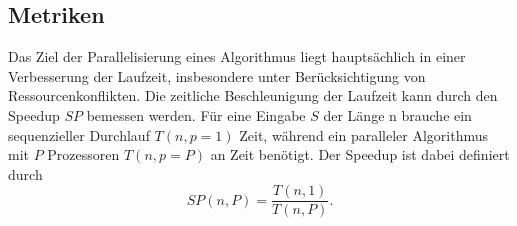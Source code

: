 \subsection{Metriken}
Das Ziel der Parallelisierung eines Algorithmus liegt hauptsächlich in einer Verbesserung der Laufzeit, insbesondere unter Berücksichtigung von Ressourcenkonflikten. Die zeitliche
Beschleunigung der Laufzeit kann durch den Speedup $SP$ bemessen werden. Für eine Eingabe $S$ der Länge n brauche ein sequenzieller Durchlauf $T(n, p=1)$ Zeit, während ein paralleler
Algorithmus mit $P$ Prozessoren $T(n,p=P)$ an Zeit benötigt. Der Speedup ist dabei definiert durch
\begin{equation}
    SP(n,P) = \frac{T(n,1)}{T(n,P)}.
\end{equation}

